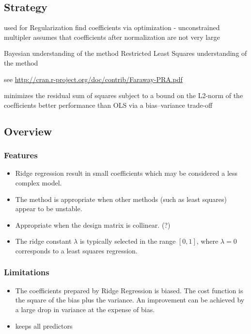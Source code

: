 \subsection{Strategy}

used for Regularization
find coefficients via optimization - unconstrained multipler
assumes that coefficients after normalization are not very large

Bayesian understanding of the method
Restricted Least Squares understanding of the method 

see \url{http://cran.r-project.org/doc/contrib/Faraway-PRA.pdf}

minimizes the residual sum of squares subject to a bound on the L2-norm of the coefﬁcients
better performance than OLS via a bias–variance trade-off



\subsection{Overview}

\subsubsection{Features}

\begin{itemize}
	\item Ridge regression result in small coefficients which may be considered a less complex model.
	\item The method is appropriate when other methods (such as least squares) appear to be unstable.
	\item Appropriate when the design matrix is collinear. (?)
	\item The ridge constant $\lambda$ is typically selected in the range $[0,1]$, where $\lambda = 0$ corresponds to a least squares regression.
\end{itemize}

\subsubsection{Limitations}

\begin{itemize}
	\item The coefficients prepared by Ridge Regression is biased. The cost function is the square of the bias plus the variance. An improvement can be achieved by a large drop in variance at the expense of bias.
	\item keeps all predictors
\end{itemize}


